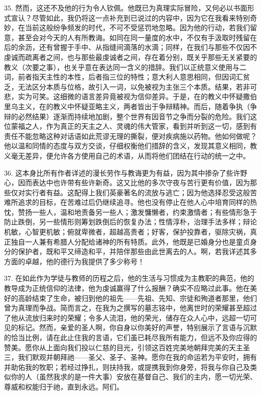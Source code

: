 35. 然而，这还不及他的行为令人钦佩。他既已为真理实际冒险，又何必以书面形式宣认？尽管如此，我仍将这一点补充到已说过的内容中，因为它在我看来特别奇妙，在当前这般纷争频发的时代，不可不受惩罚地忽略。因为他的行动，若我们留意，甚至会对今天的人有所教诲。如同在同一量度的水中，不仅有手汲取时残留在后的余沥，还有曾握于手中、从指缝间滴落的水滴；同样，在我们与那些不仅因不虔诚而疏离者之间，也与那些最虔诚者之间，存在着分别，既关乎那些无关紧要的教义（次要之事），也关乎意在表达同一含义的措辞。我们以正统意义使用与二词，前者指天主性的本性，后者指三位的特性；意大利人意思相同，但因词汇贫乏，无法区分本质与位格，故引入一词，以免被视为主张三个本质。结果，若非可悲，实为可笑。这细微的语言差异竟被视为信仰差异。于是，在的教义中怀疑撒伯里乌主义，在的教义中怀疑亚略主义，两者皆出于争辩精神。而后，随着争执（争辩的必然结果）逐渐而持续地加剧，整个世界有因音节之争而分裂的危险。我们这位蒙福之人，作为真正的天主之人、灵魂的伟大管家，看到并听到这一切，感到有责任不能忽略这种对话语如此荒谬无理的撕裂，便对疾病施以药物。他如何做呢？他以温和同情的态度与双方交谈，仔细权衡他们措辞的含义，发现其意义相同，教义毫无差异，便允许各方使用自己的术语，从而将他们团结在行动的统一之中。\par

36. 这本身比所有作者详述的漫长劳作与教诲更为有益，因为其中掺杂了些许野心，因而表达中也许带有些许新奇。这又比他的多次守夜与苦行更有价值，因为那些仅对实行者有益。这配得上我们英豪著名的流放与逃亡；因为他选择忍受这般苦难所追求的目标，在苦难过后仍继续追寻。他也没有停止在他人心中培育同样的热忱，赞扬一些人，温和地责备另一些人；激发慵懒者，约束激情者；有些情形急于防止跌倒，另一些情形则筹划跌倒后的恢复办法；性情淳朴，治理手法多样；辩论机敏，心智更机敏；俯就卑微者，超越高贵者；好客，保护投靠者，驱除灾祸，真正独自一人兼有希腊人分配给诸神的所有特质。此外，他既是已婚身分也是童贞身分的保护者，既和平又缔造和平，并陪伴那些由此世离去的人。啊，若我详述其多方面的卓越，他的德行为我提供了多少称号！\par

37. 在如此作为学徒与教师的历程之后，他的生活与习惯成为主教职的典范，他的教导成为正统信仰的法律，他为虔诚赢得了什么报酬？确实不应略过此事。他在美好的高龄结束了生命，被归到他的祖先——先祖、先知、宗徒和殉道者那里，他们曾为真理而争战。简而言之，在我为之撰写的墓志铭中，他离世时的荣耀甚至超过了他从流放归来时的荣耀；令多人流泪，他的荣光，储存在众人心中，远超一切可见的标记。然而，亲爱的圣人啊，你自身以你美好的声誉，特别展示了言语与沉默的恰当比例，请在此止住我的言语，它们虽已耗尽我所有能力，但远不及你应得的赞美。愿你从上面向我们投以仁慈的目光，引领这百姓完美地朝拜完美的天主圣三，我们默观并朝拜祂——圣父、圣子、圣神。愿你在我的命运若为平安时，拥有并助佑我的牧职；若经过挣扎，则扶持我，或提携我到你身旁，将我与你自己及类似你的人（虽然我求的是一件大事）安放在基督自己、我们的主内，愿一切光荣、尊威和权能归于祂，直到永远。阿们。\par


